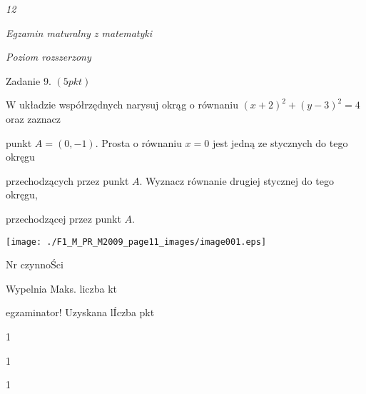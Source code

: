 \documentclass[a4paper,12pt]{article}
\begin{document}
{\it 12}

{\it Egzamin maturalny z matematyki}

{\it Poziom rozszerzony}

Zadanie 9. $(5pkt)$

$\mathrm{W}$ układzie współrzędnych narysuj okrąg o równaniu $(x+2)^{2}+(y-3)^{2}=4$ oraz zaznacz

punkt $A=(0,-1)$. Prosta o równaniu $x=0$ jest jedną ze stycznych do tego okręgu

przechodzących przez punkt $A$. Wyznacz równanie drugiej stycznej do tego okręgu,

przechodzącej przez punkt $A.$
\begin{center}
\texttt{[image: ./F1\_M\_PR\_M2009\_page11\_images/image001.eps]}
\end{center}
Nr czynnoŚci

Wypelnia Maks. liczba kt

egzaminator! Uzyskana lÍczba pkt

1

1

1
\end{document}
